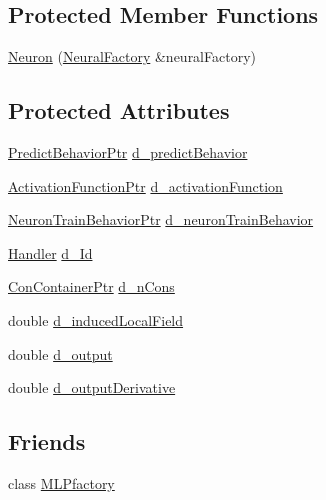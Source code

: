 \subsection*{Protected Member Functions}
\begin{DoxyCompactItemize}
\item 
\hyperlink{class_neuron_a814666c8dc635e30659aa95cc4886e5f}{Neuron} (\hyperlink{class_neural_factory}{NeuralFactory} \&neuralFactory)
\end{DoxyCompactItemize}
\subsection*{Protected Attributes}
\begin{DoxyCompactItemize}
\item 
\hyperlink{_a_m_o_r_e_8h_a1fb2f1f8fdf1e08c42ef4bdce436af93}{PredictBehaviorPtr} \hyperlink{class_neuron_a2522e221f58c84bd3a1c32647da4a411}{d\_\-predictBehavior}
\item 
\hyperlink{_a_m_o_r_e_8h_a77602a0277a02e5769c3df0adc669b17}{ActivationFunctionPtr} \hyperlink{class_neuron_ad530e9f0bb556e0469b5074e6b7f463f}{d\_\-activationFunction}
\item 
\hyperlink{_a_m_o_r_e_8h_a687ad68f1793905a403f187c0eda2ec1}{NeuronTrainBehaviorPtr} \hyperlink{class_neuron_ab435b271c3deef356620b5582630e77b}{d\_\-neuronTrainBehavior}
\item 
\hyperlink{_a_m_o_r_e_8h_abc871abb71cff6655b8172ee7240b8ef}{Handler} \hyperlink{class_neuron_ab1a34e30b663c41342e8f8eaac8bd466}{d\_\-Id}
\item 
\hyperlink{_a_m_o_r_e_8h_a1021dbaf961d1c8da6d58a8566e5778b}{ConContainerPtr} \hyperlink{class_neuron_ac3cb61c8582bb07bb3c61fe9fa07489b}{d\_\-nCons}
\item 
double \hyperlink{class_neuron_a4370eae5b594fb4c7f544fcefa298c7c}{d\_\-inducedLocalField}
\item 
double \hyperlink{class_neuron_a1e0b130755580b323da98c5332a6610e}{d\_\-output}
\item 
double \hyperlink{class_neuron_a7145844d8be9fb33ad77d47eb50fb9af}{d\_\-outputDerivative}
\end{DoxyCompactItemize}
\subsection*{Friends}
\begin{DoxyCompactItemize}
\item 
class \hyperlink{class_neuron_a1aa48940238b9487734e590ffab33a1b}{MLPfactory}
\end{DoxyCompactItemize}


